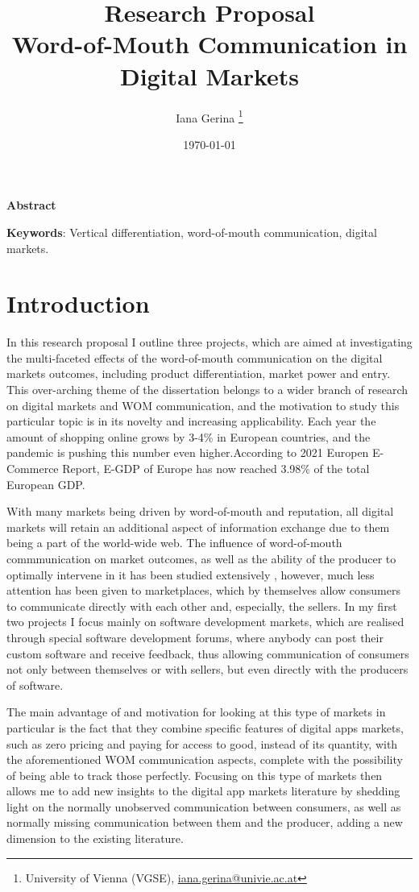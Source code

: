 \documentclass{article}
\title{\textbf{Research Proposal} \\ Word-of-Mouth Communication in Digital Markets}
\author{Iana Gerina \footnote{University of Vienna (VGSE),  \href{mailto:iana.gerina@univie.ac.at}{iana.gerina@univie.ac.at}}}
\date{\today}
\numberwithin{figure}{section}
\numberwithin{table}{section}
\theoremstyle{indented}
\numberwithin{equation}{section} %
\begin{document}
\maketitle
\thispagestyle{empty}

\begin{center}
    \textbf{Abstract}
\end{center}


\vspace{6ex}
\textbf{Keywords}: Vertical differentiation, word-of-mouth communication, digital markets. 


\clearpage
\section{Introduction}

In this research proposal I outline three projects, which are aimed at investigating the multi-faceted effects of the word-of-mouth communication on the digital markets outcomes, including product differentiation, market power and entry. This over-arching theme of the dissertation belongs to a wider branch of research on digital markets and WOM communication, and the motivation to study this particular topic is in its novelty and increasing applicability. Each year the amount of shopping online grows by 3-4\% in European countries, and the pandemic is pushing this number even higher.According to 2021 Europen E-Commerce Report, E-GDP of Europe has now reached 3.98\% of the total European GDP.  

With many markets being driven by word-of-mouth and reputation, all digital markets will retain an additional aspect of information exchange due to them being a part of the world-wide web. The influence of word-of-mouth commmunication on market outcomes, as well as the ability of the producer to optimally intervene in it has been studied extensively \citep{Mayzlin2006, Godes2009}, however, much less attention has been given to marketplaces, which by themselves allow consumers to communicate directly with each other \citep{Godes2004} and, especially, the sellers. In my first two projects I focus mainly on software development markets, which are realised through special software development forums, where anybody can post their custom software and receive feedback, thus allowing communication of consumers not only between themselves or with sellers, but even directly with the producers of software. 

The main advantage of and motivation for looking at this type of markets in particular is the fact that they combine specific features of digital apps markets, such as zero pricing and paying for access to good, instead of its quantity, with the aforementioned WOM communication aspects, complete with the possibility of being able to track those perfectly. Focusing on this type of markets then allows me to add new insights to the digital app markets literature by shedding light on the normally unobserved communication between consumers, as well as normally missing communication between them and the producer, adding a new dimension to the existing literature.
\end{document}
